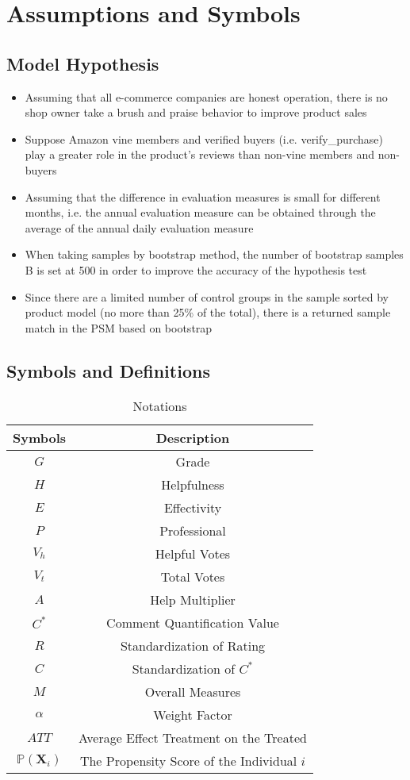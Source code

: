 \documentclass{mcmthesis}
\begin{document}
\section{Assumptions and Symbols}
\subsection{Model Hypothesis}
\begin{itemize}
\item Assuming that all e-commerce companies are honest operation, there is no shop owner take a brush and praise behavior to improve product sales
\item Suppose Amazon vine members and verified buyers (i.e. verify\_purchase) play a greater role in the product's reviews than non-vine members and non-buyers
\item Assuming that the difference in evaluation measures is small for different months, i.e. the annual evaluation measure can be obtained through the average of the annual daily evaluation measure
\item When taking samples by bootstrap method, the number of bootstrap samples B is set at 500 in order to improve the accuracy of the hypothesis test
\item Since there are a limited number of control groups in the sample sorted by product model (no more than 25\% of the total), there is a returned sample match in the PSM based on bootstrap

\end{itemize}

\subsection{Symbols and Definitions}

\begin{table}[htbp]
\centering
\caption{Notations}
	\begin{tabular}[cp{0.9\textwidth}]{cc}
		\toprule[2pt]
		Symbols & Description\\
		\midrule
		$G$ & Grade \\
		$H$ & Helpfulness \\
		$E$ & Effectivity \\
		$P$ & Professional \\
		$V_h$ & Helpful Votes\\
		$V_t$ & Total Votes\\
		$A$ & Help Multiplier\\
		$C^*$ & Comment Quantification Value\\
		$R$ & Standardization of Rating\\
		$C$ & Standardization of $C^*$ \\
		$M$ & Overall Measures\\
		$\alpha$ & Weight Factor\\
		$ATT$ & Average Effect Treatment on the Treated\\
		$\mathbb{P}\left( \boldsymbol{X}_i \right)$ & The Propensity Score of the Individual $i$\\
		\bottomrule[2pt]
	\end{tabular}
	\label{tab1} 

\end{table}
\end{document}
